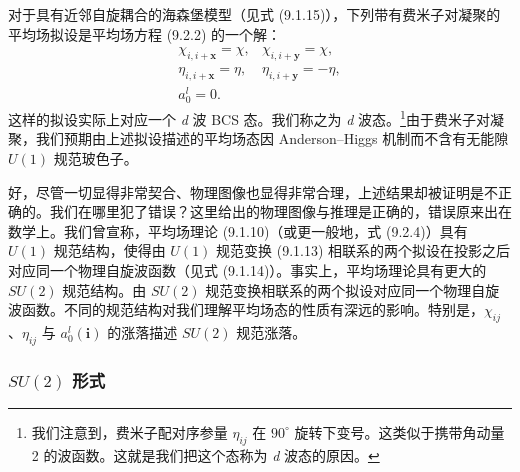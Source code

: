对于具有近邻自旋耦合的海森堡模型（见式 (9.1.15)），下列带有费米子对凝聚的平均场拟设是平均场方程 (9.2.2) 的一个解：
\begin{equation*}
\begin{array}{ll}
\chi_{i,i+\pmb{x}}=\chi, & \chi_{i,i+\pmb{y}}=\chi,\\
\eta_{i,i+\pmb{x}}=\eta, & \eta_{i,i+\pmb{y}}=-\eta,\\
a^l_0=0. &
\end{array}
\tag{9.2.5}
\end{equation*}
这样的拟设实际上对应一个 \emph{d} 波 BCS 态。我们称之为 \emph{d} 波态。\footnote{我们注意到，费米子配对序参量 $\eta_{ij}$ 在 $90^{\circ}$ 旋转下变号。这类似于携带角动量 2 的波函数。这就是我们把这个态称为 \emph{d} 波态的原因。}由于费米子对凝聚，我们预期由上述拟设描述的平均场态因 Anderson--Higgs 机制而不含有无能隙 $U(1)$ 规范玻色子。

好，尽管一切显得非常契合、物理图像也显得非常合理，上述结果却被证明是不正确的。我们在哪里犯了错误？这里给出的物理图像与推理是正确的，错误原来出在数学上。我们曾宣称，平均场理论 (9.1.10)（或更一般地，式 (9.2.4)）具有 $U(1)$ 规范结构，使得由 $U(1)$ 规范变换 (9.1.13) 相联系的两个拟设在投影之后对应同一个物理自旋波函数（见式 (9.1.14)）。事实上，平均场理论具有更大的 $SU(2)$ 规范结构。由 $SU(2)$ 规范变换相联系的两个拟设对应同一个物理自旋波函数。不同的规范结构对我们理解平均场态的性质有深远的影响。特别是，$\chi_{ij}$、$\eta_{ij}$ 与 $a^l_0(\pmb{i})$ 的涨落描述 $SU(2)$ 规范涨落。

\subsubsection{$SU(2)$ 形式}

